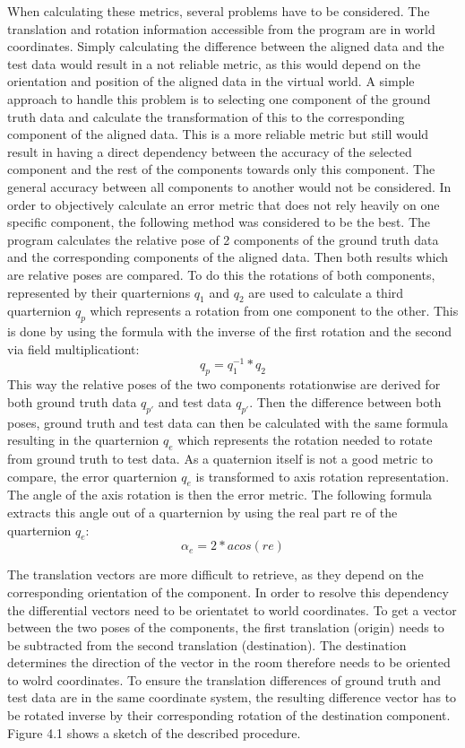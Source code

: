 \documentclass[hyperref,english,bachelorofscience,bibnum]{cgvpub}
\begin{document}
When calculating these metrics, several problems have to be considered. The translation and rotation information accessible from the program are in world coordinates. Simply calculating the difference between the aligned data and the test data would result in a not reliable metric, as this would depend on the orientation and position of the aligned data in the virtual world. A simple approach to handle this problem is to selecting one component of the ground truth data and calculate the transformation of this to the corresponding component of the aligned data. This is a more reliable metric but still would result in having a direct dependency between the accuracy of the selected component and the rest of the components towards only this component. The general accuracy between all components to another would not be considered. 
In order to objectively calculate an error metric that does not rely heavily on one specific component, the following method was considered to be the best. The program calculates the relative pose of 2 components of the ground truth data and the corresponding components of the aligned data. Then both results which are relative poses are compared. 
To do this the rotations of both components, represented by their quarternions $q_1$ and $q_2$ are used to calculate a third quarternion $q_p$ which represents a rotation from one component to the other. This is done by using the formula with the inverse of the first rotation and the second via field multiplicationt:
\[
q_p = q_1^{-1} * q_2
\]
This way the relative poses of the two components rotationwise are derived for both ground truth data $q_{p'}$ and test data $q_{p'}$. Then the difference between both poses, ground truth and test data can then be calculated with the same formula resulting in the quarternion $q_e$ which represents the rotation needed to rotate from ground truth to test data. As a quaternion itself is not a good metric to compare, the error quarternion $q_e$ is transformed to axis rotation representation. The angle of the axis rotation is then the error metric. 
The following formula extracts this angle out of a quarternion by using the real part re of the quarternion $q_e$:%
\[
	\alpha_e = 2 *  acos ( re )
\]

The translation vectors are more difficult to retrieve, as they depend on the corresponding orientation of the component. In order to resolve this dependency the differential vectors need to be orientatet to world coordinates. To get a vector between the two poses of the components, the first translation (origin) needs to be subtracted from the second translation (destination). The destination determines the direction of the vector in the room therefore needs to be oriented to wolrd coordinates. To ensure the translation differences of ground truth and test data are in the same coordinate system, the resulting difference vector has to be rotated inverse by their corresponding rotation of the destination component. Figure 4.1 shows a sketch of the described procedure.
\end{document}
